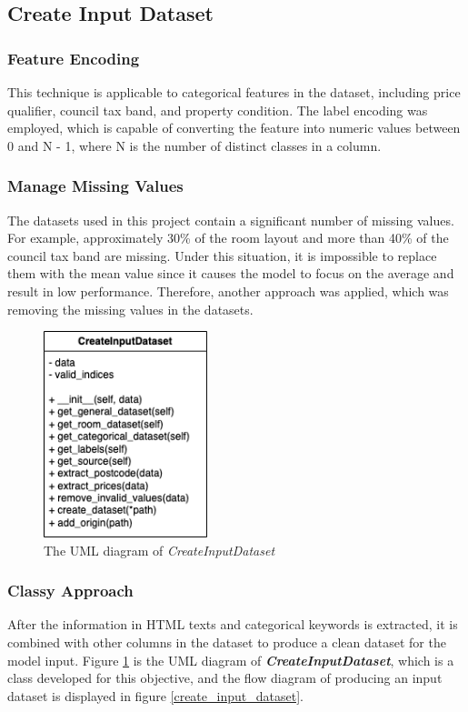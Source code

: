 \documentclass[12pt,twoside]{report}
\begin{document}
\subsection{Create Input Dataset}

\subsubsection{Feature Encoding}
This technique is applicable to categorical features in the dataset, including price qualifier, council tax band, and property condition. The label encoding was employed, which is capable of converting the feature into numeric values between 0 and N - 1, where N is the number of distinct classes in a column.

\subsubsection{Manage Missing Values}
The datasets used in this project contain a significant number of missing values. For example, approximately 30\% of the room layout and more than 40\% of the council tax band are missing. Under this situation, it is impossible to replace them with the mean value since it causes the model to focus on the average and result in low performance. Therefore, another approach was applied, which was removing the missing values in the datasets. 

\begin{figure}[!htbp]
	\centering
	\includegraphics[height=6cm]{uml_create_input_dataset}
	\caption{The UML diagram of \textit{CreateInputDataset}}
	\label{uml_create_input_dataset}
\end{figure}

\subsubsection{Classy Approach}
After the information in HTML texts and categorical keywords is extracted, it is combined with other columns in the dataset to produce a clean dataset for the model input.  Figure \ref{uml_create_input_dataset} is the UML diagram of \textit{\textbf{CreateInputDataset}}, which is a class developed for this objective, and the flow diagram of producing an input dataset is displayed in figure \ref{create_input_dataset}.
\end{document}
